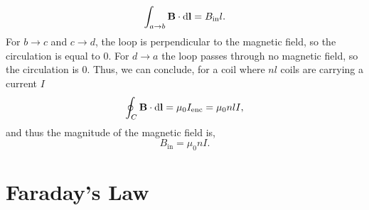 \documentclass{book}
\begin{document}
\begin{equation}
    \int_{a\to b}\vb{B}\cdot\dd{\vb{l}} = B_{\text{in}}l.
\end{equation}
For $b\to c$ and $c \to d$, the loop is perpendicular to the magnetic field, so the circulation is equal to 0. For $d \to a$ the loop passes through no magnetic field, so the circulation is 0. Thus, we can conclude, for a coil where $nl$ coils are carrying a current $I$
\begin{equation}
    \oint_C \vb{B}\cdot \dd{\vb{l}} = \mu_0 I_{\text{enc}} = \mu_0 nlI,
\end{equation}
and thus the magnitude of the magnetic field is,
\begin{equation}
    B_{\text{in}} = \mu_0 n I.
\end{equation}
\section{Faraday's Law}
\end{document}
